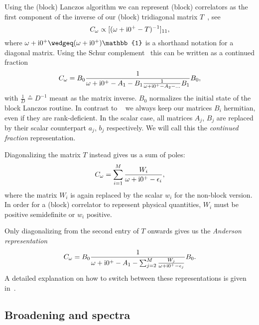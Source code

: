 Using the (block) Lanczos algorithm we can represent (block) correlators as the first component
of the inverse of our (block) tridiagonal matrix $T$~\cite{Lu2014},
see 
\begin{equation}
    C_\omega
    \propto
    [(\omega + \mathrm{i}0^+ - T)^{-1}]_{11},
\end{equation}
where $\omega + \mi0^+ \wedgeq (\omega + \mi0^+)\mathbb{1}$ is a shorthand notation
for a diagonal matrix.
Using the Schur complement~\cite{Schur1917} this can be written as a continued fraction
\begin{equation}
    C_\omega
    =
    B_0\frac{1}{\omega + \mathrm{i}0^+ - A_1 - B_1\frac{1}{\omega + \mathrm{i}0^+ - A_2 - \ldots}B_1}B_0,
\end{equation}
with $\frac{1}{D} \wedgeq D^{-1}$ meant as the matrix inverse.
$B_0$ normalizes the initial state of
the block Lanczos routine.
In contrast to \quanty~\cite{Ackermann2024} we always keep our matrices $B_i$ hermitian,
even if they are rank-deficient.
In the scalar case, all matrices $A_j$, $B_j$ are replaced by
their scalar counterpart $a_j$, $b_j$ respectively.
We will call this the \emph{continued fraction} representation.

Diagonalizing the matrix $T$ instead gives us a sum of poles:
\begin{equation}
    C_\omega
    =
    \sum_{i=1}^M \frac{W_i}{\omega + \mathrm{i}0^+ - \epsilon_i},
    \label{eq:correlator-sum}
\end{equation}
where the matrix $W_i$ is again replaced by the scalar $w_i$ for the non-block version.
In order for a (block) correlator to represent physical quantities,
$W_i$ must be positive semidefinite or
$w_i$ positive.

Only diagonalizing from the second entry of $T$ onwards gives us the \emph{Anderson representation}
\begin{equation}
    C_\omega
    =
    B_0\frac{1}{\omega + \mathrm{i}0^+ - A_1 - \sum_{j=2}^M \frac{W_j}{\omega + \mathrm{i}0^+ - \epsilon_j}}B_0.
    \label{eq:correlator-anderson}
\end{equation}
A detailed explanation on how to switch between these representations is given in~\cite{Lu2014}.

\subsection{Broadening and spectra}

